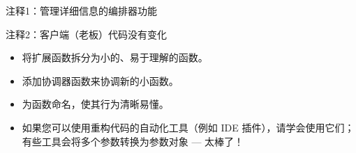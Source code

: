 {\footnotesize
注释1：管理详细信息的编排器功能

注释2：客户端（老板）代码没有变化
}


\begin{itemize}
\item
将扩展函数拆分为小的、易于理解的函数。

\item
添加协调器函数来协调新的小函数。

\item
为函数命名，使其行为清晰易懂。

\item
如果您可以使用重构代码的自动化工具（例如 IDE 插件），请学会使用它们；有些工具会将多个参数转换为参数对象 — 太棒了！
\end{itemize}

